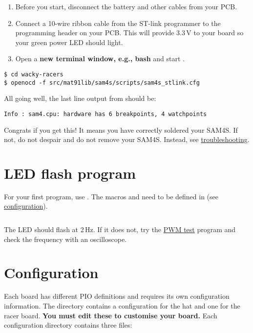 \begin{enumerate}
\item
  Before you start, disconnect the battery and other cables from your
  PCB.
\item
  Connect a 10-wire ribbon cable from the ST-link programmer to the
  programming header on your PCB. This will provide 3.3\,V to your
  board so your green power LED should light.
\item
  Open a \textbf{new terminal window, e.g., bash} and
  start .
\end{enumerate}

\begin{verbatim}
$ cd wacky-racers
$ openocd -f src/mat91lib/sam4s/scripts/sam4s_stlink.cfg
\end{verbatim}

All going well, the last line output from  should be:

\begin{verbatim}
Info : sam4.cpu: hardware has 6 breakpoints, 4 watchpoints
\end{verbatim}

Congrats if you get this! It means you have correctly soldered your
SAM4S. If not, do not despair and do not remove your SAM4S. Instead,
see \protect\hyperref[troubleshooting]{troubleshooting}.


\section{LED flash program}
\label{led-flash-program}

For your first program, use
. The macros 
and  need to be defined in  (see
\protect\hyperref[configuration]{configuration}).

\inputminted{C}{../../src/test-apps/ledflash1/ledflash1.c}

The LED should flash at 2\,Hz.  If it does not, try the
\hyperref[pwm-test]{PWM test} program and check the frequency with an
oscilloscope.


\section{Configuration}
\label{configuration}

Each board has different PIO definitions and requires its own
configuration information. The  directory contains a
configuration for the hat and one for the racer board.  \textbf{You
must edit these to customise your board.}  Each configuration
directory contains three files:

